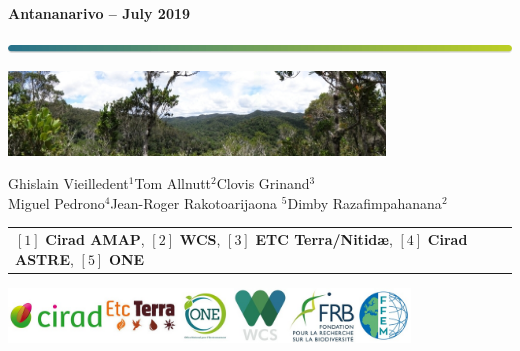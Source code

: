 
{
  \begin{frame}
  \begin{center}
  \small{\textbf{Antananarivo -- July 2019}}
  \end{center}
  \vspace{-0.5cm}
  \titlepage %
  \vspace{-3cm}
  \begin{center}
    \includegraphics[width=\textwidth]{figs/Barre_couleur}
    
    \vspace{0.25cm}
    
    \includegraphics[width=10cm]{figs/Banniere}
    
    \small{Ghislain Vieilledent$^{1}$\hspace{0.5cm}Tom Allnutt$^{2}$\hspace{0.5cm}Clovis
      Grinand$^{3}$\\Miguel Pedrono$^{4}$\hspace{0.5cm}Jean-Roger Rakotoarijaona
      $^{5}$\hspace{0.5cm}Dimby Razafimpahanana$^{2}$}
      
    \vspace{0.25cm}
    
    {\scriptsize
      \begin{tabular}{l}
        $[1]$ \textbf{Cirad AMAP}, $[2]$ \textbf{WCS}, $[3]$ \textbf{ETC Terra/Nitid\ae}, $[4]$
        \textbf{Cirad ASTRE}, $[5]$ \textbf{ONE}  
      \end{tabular}
    }
    
    \includegraphics[width=0.8\textwidth]{figs/partners_logos}
    
  \end{center}
  \end{frame}
}

